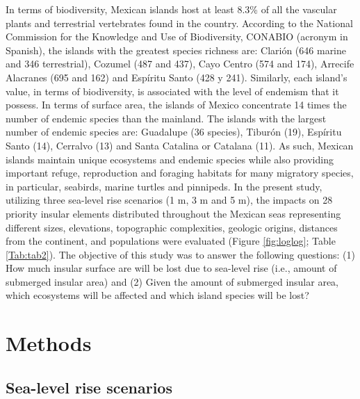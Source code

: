 \documentclass{article} %
\begin{document}
In terms of biodiversity, Mexican islands host at least 8.3\% of all the vascular plants and terrestrial vertebrates found in the country. According to the National Commission for the Knowledge and Use of Biodiversity, CONABIO (acronym in Spanish), the islands with the greatest species richness are: Clarión (646 marine and 346 terrestrial), Cozumel (487 and 437), Cayo Centro (574 and 174), Arrecife Alacranes (695 and 162) and Espíritu Santo (428 y 241). Similarly, each island’s value, in terms of biodiversity, is associated with the level of endemism that it possess. In terms of surface area, the islands of Mexico concentrate 14 times the number of endemic species than the mainland. The islands with the largest number
of endemic species are: Guadalupe (36 species), Tiburón (19), Espíritu Santo (14),
Cerralvo (13) and Santa Catalina or Catalana (11). As such, Mexican islands maintain
unique ecosystems and endemic species while also providing important refuge,
reproduction and foraging habitats for many migratory species, in particular,
seabirds, marine turtles and pinnipeds. In the present study, utilizing three sea-level
rise scenarios (1 m, 3 m and 5 m), the impacts on 28 priority insular elements
distributed throughout the Mexican seas representing different sizes, elevations,
topographic complexities, geologic origins, distances from the continent, and
populations were evaluated (Figure \ref{fig:loglog}; Table \ref{Tab:tab2}). The objective of this study was to answer the following questions: (1) How much insular surface are will be lost due to
sea-level rise (i.e., amount of submerged insular area) and (2) Given the amount of
submerged insular area, which ecosystems will be affected and which island species
will be lost?


\section{Methods}

\subsection{Sea-level rise scenarios}
\end{document}
